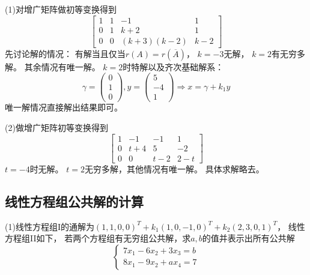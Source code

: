 \begin{solution}
  (1)对增广矩阵做初等变换得到
  \begin{equation*}
  \left[
    \begin{array}{cccc}
      1&1&-1&1\\
      0&1&k+2&1\\
      0&0&(k+3)(k-2)&k-2
    \end{array}
  \right]
  \end{equation*}
  先讨论解的情况：
  有解当且仅当$r(A) = r(\overline{A})$，
  $k = -3$无解，
  $k = 2$有无穷多解。
  其余情况有唯一解。
  $k = 2$时特解以及齐次基础解系：
  \begin{equation*}
    \gamma = \left(
      \begin{array}{c}
        0\\
        1\\
        0
      \end{array}
    \right), y = \left(
      \begin{array}{c}
        5\\
        -4\\
        1
      \end{array}
    \right) \Rightarrow x = \gamma + k_1y
  \end{equation*}
  唯一解情况直接解出结果即可。

  (2)做增广矩阵初等变换得到
  \begin{equation*}
    \left[
      \begin{array}{cccc}
        1&-1&-1&1\\
        0&t+4&5&-2\\
        0&0&t-2&2-t
      \end{array}
    \right]
  \end{equation*}
  $t = -4$时无解。
  $t = 2$无穷多解，其他情况有唯一解。
  具体求解略去。
\end{solution}



\subsection{线性方程组公共解的计算}

\begin{exercise}[公共解的情况]
  (1)线性方程组I的通解为$(1,1,0,0)^T + k_1(1,0,-1,0)^T+k_2(2,3,0,1)^T$，
  线性方程组II如下，
  若两个方程组有无穷组公共解，求$a,b$的值并表示出所有公共解
  \begin{equation*}
    \begin{cases}
      7x_1 - 6x_2 + 3x_3 = b\\
      8x_1 - 9x_2 + ax_4 = 7
    \end{cases}
  \end{equation*}
\end{exercise}

